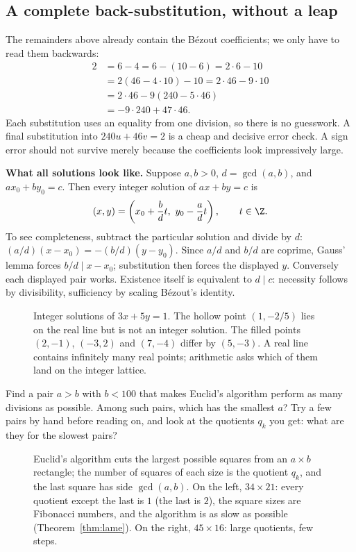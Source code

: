 \subsection*{A complete back-substitution, without a leap}
The remainders above already contain the B\'ezout coefficients; we only have to read them backwards:
\[
\begin{aligned}
2&=6-4=6-(10-6)=2\cdot6-10\\
 &=2(46-4\cdot10)-10=2\cdot46-9\cdot10\\
 &=2\cdot46-9(240-5\cdot46)\\
 &=-9\cdot240+47\cdot46.
\end{aligned}
\]
Each substitution uses an equality from one division, so there is no guesswork. A final substitution into $240u+46v=2$ is a cheap and decisive error check. A sign error should not survive merely because the coefficients look impressively large.

\textbf{What all solutions look like.} Suppose $a,b>0$, $d=\gcd(a,b)$, and $ax_0+by_0=c$. Then every integer solution of $ax+by=c$ is
\[
(x,y)=\left(x_0+\frac bd t,\ y_0-\frac ad t\right),\qquad t\in\Z.
\]
To see completeness, subtract the particular solution and divide by $d$: $(a/d)(x-x_0)=-(b/d)(y-y_0)$. Since $a/d$ and $b/d$ are coprime, Gauss' lemma forces $b/d\mid x-x_0$; substitution then forces the displayed $y$. Conversely each displayed pair works. Existence itself is equivalent to $d\mid c$: necessity follows by divisibility, sufficiency by scaling B\'ezout's identity.

\begin{figure}[ht]
\centering{}
\caption{Integer solutions of $3x+5y=1$. The hollow point $(1,-2/5)$ lies on the real line but is not an integer solution. The filled points $(2,-1)$, $(-3,2)$ and $(7,-4)$ differ by $(5,-3)$. A real line contains infinitely many real points; arithmetic asks which of them land on the integer lattice.}
\label{fig:bezout-line}
\end{figure}

\begin{think}
Find a pair $a>b$ with $b<100$ that makes Euclid's algorithm perform as many divisions as possible. Among such pairs, which has the smallest $a$? Try a few pairs by hand before reading on, and look at the quotients $q_k$ you get: what are they for the slowest pairs?
\end{think}

\begin{figure}[ht]
\centering
{}
\caption{Euclid's algorithm cuts the largest possible squares from an $a\times b$ rectangle; the number of squares of each size is the quotient $q_k$, and the last square has side $\gcd(a,b)$. On the left, $34\times21$: every quotient except the last is $1$ (the last is $2$), the square sizes are Fibonacci numbers, and the algorithm is as slow as possible (Theorem~\ref{thm:lame}). On the right, $45\times16$: large quotients, few steps.}
\label{fig:euclid}
\end{figure}

